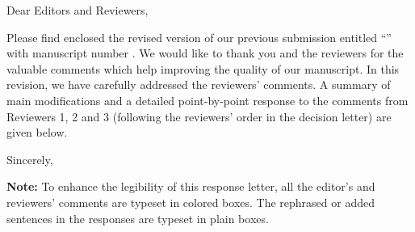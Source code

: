 \thispagestyle{empty}
\noindent Dear Editors and Reviewers, %

Please find enclosed the revised version of our previous submission entitled \enquote{\thetitle} with manuscript number \manuscript. We would like to thank you and the reviewers for the valuable comments which help improving the quality of our manuscript.
In this revision, we have carefully addressed the reviewers' comments. A summary of main modifications and a detailed point-by-point response to the comments from Reviewers 1, 2 and 3 (following the reviewers' order in the decision letter) are given below.

\vspace{8em}

\noindent Sincerely,

\noindent\theauthor

\vfill
\textbf{Note:} To enhance the legibility of this response letter, all the editor's and reviewers' comments are typeset in colored boxes. The rephrased or added sentences in the responses are typeset in plain boxes.
